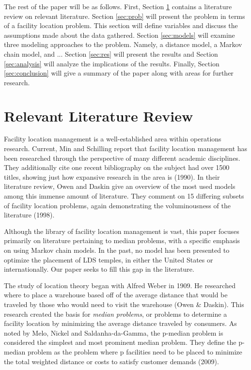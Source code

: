 \documentclass[twoside,twocolumn]{article}
\begin{document}
The rest of the paper will be as follows.
First, Section \ref{sec:litrev} contains a literature review on relevant literature.
Section \ref{sec:prob} will present the problem in terms of a facility location problem.
This section will define variables and discuss the assumptions made about the data gathered.
Section \ref{sec:models} will examine three modeling approaches to the problem.
Namely, a distance model, a Markov chain model, and ... %
Section \ref{sec:res} will present the results and Section \ref{sec:analysis} will analyze the implications of the results.
Finally, Section \ref{sec:conclusion} will give a summary of the paper along with areas for further research.

\section{Relevant Literature Review}
\label{sec:litrev}
Facility location management is a well-established area within operations research. Current, Min and Schilling report that facility location management has been researched through the perspective of many different academic disciplines. They additionally cite one recent bibliography on the subject had over 1500 titles, showing just how expansive research in the area is (1990).
In their literature review, Owen and Daskin give an overview of the most used models among this immense amount of literature. 
They comment on 15 differing subsets of facility location problems, again demonstrating the voluminousness of the literature (1998).

Although the library of facility location management is vast, this paper focuses primarily on literature pertaining to median problems, with a specific emphasis on using Markov chain models. In the past, no model has been presented to optimize the placement of LDS temples, in either the United States or internationally. Our paper seeks to fill this gap in the literature.

The study of location theory began with Alfred Weber in 1909. 
He researched where to place a warehouse based off of the average distance that would be traveled by those who would need to visit the warehouse (Owen \& Daskin).
This research created the basis for {\em median problems}, or problems to determine a facility location by minimizing the average distance traveled by consumers.
As noted by Melo, Nickel and Saldanha-da-Gamma, the p-median problem is considered the simplest and most prominent median problem. They define the p-median problem as the problem where p facilities need to be placed to minimize the total weighted distance or costs to satisfy customer demands (2009).
\end{document}
